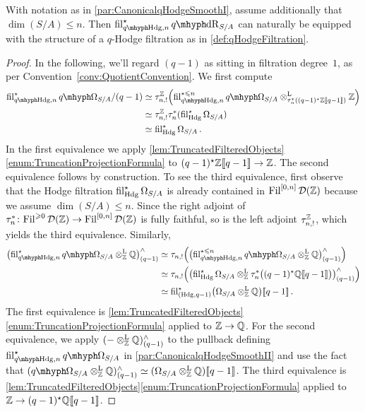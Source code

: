 \documentclass[DIV=12,numbers=enddot,leqno,bibliography=totoc]{scrartcl}
\begin{document}
	\begin{lem}\label{lem:CanonicalqHodgeSmooth}
		With notation as in \cref{par:CanonicalqHodgeSmoothI}, assume additionally that $\dim(S/A)\leqslant n$. Then  $\fil_{\qHodge,n}^\star\qdeRham_{S/A}$ can naturally be equipped with the structure of a $q$-Hodge filtration as in \cref{def:qHodgeFiltration}.
	\end{lem}
	\begin{proof}
		In the following, we'll regard $(q-1)$ as sitting in filtration degree~$1$, as per Convention~\cref{conv:QuotientConvention}. We first compute
		\begin{align*}
			\fil_{\qHodge,n}^\star\qOmega_{S/A}/(q-1)&\simeq \tau_{n,!}^{\IZ}\left(\fil_{\qHodge,n}^{\star\leqslant n}\qOmega_{S/A}\lotimes_{\tau_n^*((q-1)^\star\IZ\qpower)}\IZ\right)\\
			&\simeq \tau_{n,!}^\IZ\tau_n^*(\fil_{\Hodge}^{\star}\Omega_{S/A})\\
			&\simeq \fil_{\Hodge}^{\star}\Omega_{S/A}\,.
		\end{align*}
		In the first equivalence we apply \cref{lem:TruncatedFilteredObjects}\cref{enum:TruncationProjectionFormula} to $(q-1)^\star\mathbb{Z}\llbracket q-1\rrbracket\rightarrow \mathbb{Z}$. The second equivalence follows by construction. To see the third equivalence, first observe that the Hodge filtration $\operatorname{fil}_{\mathrm{Hdg}}^\star\Omega_{S/A}$ is already contained in $\operatorname{Fil}^{[0,n]}\mathcal{D}(\mathbb{Z})$ because we assume $\dim(S/A)\leqslant n$. Since the right adjoint of $\tau_n^*\colon \Fil^{\geqslant 0}\Dd(\IZ)\rightarrow \Fil^{[0,n]}\Dd(\IZ)$ is fully faithful, so is the left adjoint $\tau_{n,!}^{\mathbb{Z}}$, which yields the third equivalence. Similarly,
		\begin{align*}
			\bigl(\fil_{\qHodge,n}^\star\qOmega_{S/A}\lotimes_\IZ\IQ\bigr)_{(q-1)}^\complete&\simeq \tau_{n,!}\left(\bigl(\fil_{\qHodge,n}^{\star\leqslant n}\qOmega_{S/A}\lotimes_\IZ\IQ\bigr)_{(q-1)}^\complete\right)\\
			&\simeq \tau_{n,!}\left(\bigl(\fil_{\Hodge}^\star\Omega_{S/A}\lotimes_\IZ\tau_n^*\bigl((q-1)^\star\IQ\qpower\bigr)\bigr)_{(q-1)}^\complete\right)\\ &\simeq \fil_{(\Hodge,q-1)}^\star\bigl(\Omega_{S/A}\lotimes_\IZ\IQ\bigr)\qpower\,.
		\end{align*}
		The first equivalence is \cref{lem:TruncatedFilteredObjects}\cref{enum:TruncationProjectionFormula} applied to $\mathbb{Z}\rightarrow \mathbb{Q}$. For the second equivalence, we apply $(-\otimes^{\mathrm{L}}_{\mathbb{Z}}\mathbb{Q})_{(q-1)}^\wedge$ to the pullback defining $\fil_{\qHodge,n}^\star\qOmega_{S/A}$ in \cref{par:CanonicalqHodgeSmoothII} and use the fact that $(\qOmega_{S/A}\lotimes_\IZ\IQ)_{(q-1)}^\complete\simeq (\Omega_{S/A}\lotimes_\IZ\IQ)\qpower$. The third equivalence is \cref{lem:TruncatedFilteredObjects}\cref{enum:TruncationProjectionFormula} applied to $\mathbb{Z}\rightarrow (q-1)^\star\mathbb{Q}\llbracket q-1\rrbracket$.
		

\end{proof}
\end{document}
